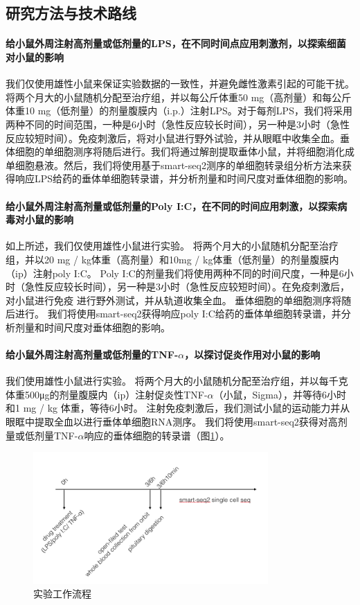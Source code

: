 \subsection{研究方法与技术路线}
\paragraph{给小鼠外周注射高剂量或低剂量的LPS，在不同时间点应用刺激剂，以探索细菌对小鼠的影响}
  我们仅使用雄性小鼠来保证实验数据的一致性，并避免雌性激素引起的可能干扰。将两个月大的小鼠随机分配至治疗组，并以每公斤体重50 mg（高剂量）和每公斤体重10 mg（低剂量）的剂量腹膜内（i.p.）注射LPS。对于每剂LPS，我们将采用两种不同的时间范围，一种是6小时（急性反应较长时间），另一种是3小时（急性反应较短时间）。免疫刺激后，将对小鼠进行野外试验，并从眼眶中收集全血。垂体细胞的单细胞测序将随后进行。我们将通过解剖提取垂体小鼠，并将细胞消化成单细胞悬液。然后，我们将使用基于smart-seq2测序的单细胞转录组分析方法来获得响应LPS给药的垂体单细胞转录谱，并分析剂量和时间尺度对垂体细胞的影响。
\paragraph{给小鼠外周注射高剂量或低剂量的Poly I:C，在不同的时间应用刺激，以探索病毒对小鼠的影响}
  如上所述，我们仅使用雄性小鼠进行实验。 将两个月大的小鼠随机分配至治疗组，并以20 mg / kg体重（高剂量）和10mg / kg体重（低剂量）的剂量腹膜内（ip）注射poly I:C。 Poly I:C的剂量我们将使用两种不同的时间尺度，一种是6小时（急性反应较长时间），另一种是3小时（急性反应较短时间）。在免疫刺激后，对小鼠进行免疫 进行野外测试，并从轨道收集全血。 垂体细胞的单细胞测序将随后进行。 我们将使用smart-seq2获得响应poly I:C给药的垂体单细胞转录谱，并分析剂量和时间尺度对垂体细胞的影响。
\paragraph{给小鼠外周注射高剂量或低剂量的TNF-$\alpha$，以探讨促炎作用对小鼠的影响}
  我们使用雄性小鼠进行实验。 将两个月大的小鼠随机分配至治疗组，并以每千克体重500μg的剂量腹膜内（ip）注射促炎性TNF-$\alpha$（小鼠，Sigma），并等待6小时和1 mg / kg 体重，等待6小时。 注射免疫刺激后，我们测试小鼠的运动能力并从眼眶中提取全血以进行垂体单细胞RNA测序。 我们将使用smart-seq2获得对高剂量或低剂量TNF-$\alpha$响应的垂体细胞的转录谱（图\ref{fig:scseq-expr}）。
\begin{figure}[!htb]
  \centering
  \includegraphics[width=0.8\textwidth]{figs/scseq-expr.png}
  \caption{实验工作流程}
  \label{fig:scseq-expr}
\end{figure}

